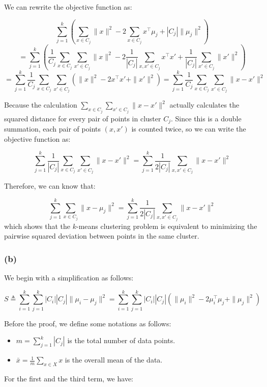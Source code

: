 \documentclass[12pt]{article}
\begin{document}
We can rewrite the objective function as:

\[
    \sum_{j=1}^k \left( \sum_{x \in C_j} \| x \|^2 - 2 \sum_{x \in C_j} x^\top \mu_j + |C_j| \| \mu_j \|^2 \right)
\]
\[
    = \sum_{j=1}^k \left( \frac{1}{C_j}\sum_{x \in C_j}\sum_{x' \in C_j}  \| x \|^2 -2  \frac{1}{|C_j|} \sum_{x, x' \in C_j} x^\top x' + \frac{1}{|C_j|} \sum_{x' \in C_j} \|x' \|^2 \right)
\]
\[
    = \sum_{j=1}^k \frac{1}{C_j}\sum_{x \in C_j}\sum_{x' \in C_j}  \left(\| x \|^2 -2 x^\top x' + \| x' \| ^2 \right) = \sum_{j=1}^k \frac{1}{C_j}\sum_{x \in C_j}\sum_{x' \in C_j} \| x - x' \|^2
\]

Because the calculation $\sum_{x \in C_j}\sum_{x' \in C_j} \| x - x' \|^2$
actually calculates the squared distance for every pair of points in cluster \( C_j \). Since this is a double summation, each pair of points \( (x, x') \) is counted twice,
so we can write the objective function as:

\[
    \sum_{j=1}^k \frac{1}{|C_j|} \sum_{x \in C_j} \sum_{x' \in C_j} \| x - x' \|^2 = \sum_{j=1}^k \frac{1}{2 |C_j|} \sum_{x, x' \in C_j} \| x - x' \|^2
\]

Therefore, we can know that: 

\[
\sum_{j=1}^k \sum_{x \in C_j} \| x - \mu_j \|^2 = \sum_{j=1}^k \frac{1}{2 |C_j|} \sum_{x, x' \in C_j} \| x - x' \|^2
\]
which shows that the $k$-means clustering problem is equivalent to minimizing the pairwise squared deviation between points in the same cluster.

\subsubsection*{(b)}

We begin with a simplification as follows:

\[
S \triangleq \sum_{i=1}^k \sum_{j=1}^k |C_i| |C_j| \| \mu_i - \mu_j \|^2 = \sum_{i=1}^k \sum_{j=1}^k |C_i| |C_j| \left( \| \mu_i \|^2 - 2 \mu_i^\top \mu_j + \| \mu_j \|^2 \right)
\]

Before the proof, we define some notations as follows:

\begin{itemize}
    \item \(m = \sum_{j=1}^k |C_j| \) is the total number of data points.
    \item \( \bar{x} = \frac{1}{m} \sum_{x \in X} x \) is the overall mean of the data.
\end{itemize}

For the first and the third term, we have:
\end{document}
